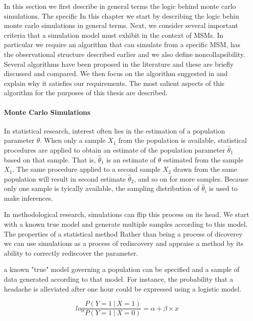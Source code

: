 \documentclass[11pt]{article}
\begin{document}
In this section we first describe in general terms the logic behind
monte carlo simulations. The specific In this chapter we start by
describing the logic behin monte carlo simulations in general terms.
Next, we consider several important criteria that a simulation model
must exhibit in the context of MSMs. In particular we require an
algorithm that can simulate from a specific MSM, has the observational
structure described earlier and we also define noncollapsibility.
Several algorithms have been proposed in the literature and these are
briefly discussed and compared. We then focus on the algorithm suggested
in \citet{} and explain why it satisfies our requirements. The most
salient aspects of this algorithm for the purposes of this thesis are
described.

    \paragraph{Monte Carlo Simulations}\label{monte-carlo-simulations}

In statistical research, interest often lies in the estimation of a
population parameter \(\theta\). When only a sample \(X_1\) from the
population is available, statistical procedures are applied to obtain an
estimate of the population parameter \(\hat \theta_1\) based on that
sample. That is, \(\hat \theta_1\) is an estimate of \(\theta\)
estimated from the sample \(X_1\). The same procedure applied to a
second sample \(X_2\) drawn from the same population will result in
second estimate \(\hat \theta_2\), and so on for more samples. Because
only one sample is tyically available, the sampling distribution of
\(\hat \theta_i\) is used to make inferences. \linebreak 

In methodological research, simulations can flip this process on its
head. We start with a known true model and generate multiple samples
according to this model. The properties of a statistical method Rather
than being a process of dicoverey we can use simulations as a process of
rediscovery and appraise a method by its ability to correctly rediscover
the parameter. \linebreak

a known "true" model governing a population can be specified and a
sample of data generated according to that model. For instance, the
probability that a headache is alleviated after one hour could be
expressed using a logistic model.

\[log \frac{P(Y = 1\ |\ X = 1)}{P(Y = 1\ |\ X = 0)} = \alpha + \beta \times x\]
\end{document}
